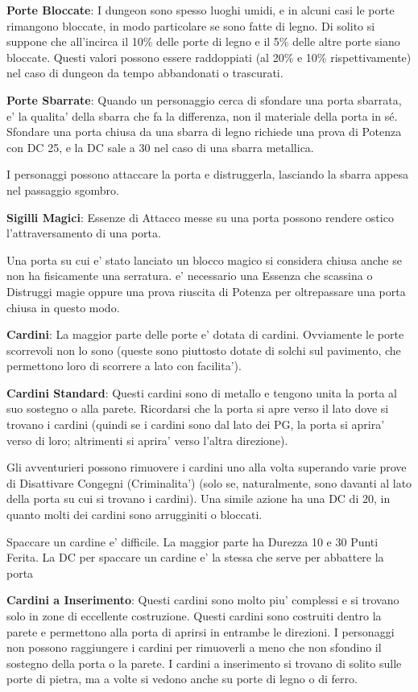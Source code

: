\documentclass[a4paper,11pt,twoside,openany]{book}
\begin{document}
{\textbf{Porte Bloccate}: I dungeon sono spesso luoghi umidi, e in alcuni casi le porte rimangono bloccate, in modo particolare se sono fatte di legno. Di solito si suppone che all'incirca il 10\% delle porte di legno e il 5\% delle altre porte siano bloccate. Questi valori possono essere raddoppiati (al 20\% e 10\% rispettivamente) nel caso di dungeon da tempo abbandonati o trascurati.

\textbf{Porte Sbarrate}: Quando un personaggio cerca di sfondare una porta sbarrata, e' la qualita' della sbarra che fa la differenza, non il materiale della porta in sé. Sfondare una porta chiusa da una sbarra di legno richiede una prova di Potenza con DC 25, e la DC sale a 30 nel caso di una sbarra metallica.

I personaggi possono attaccare la porta e distruggerla, lasciando la sbarra appesa nel passaggio sgombro.

\textbf{Sigilli Magici}: Essenze di Attacco messe su una porta possono rendere ostico l'attraversamento di una porta.

Una porta su cui e' stato lanciato un blocco magico si considera chiusa anche se non ha fisicamente una serratura. e' necessario una Essenza che scassina o Distruggi magie oppure una prova riuscita di Potenza per oltrepassare una porta chiusa in questo modo.

\textbf{Cardini}: La maggior parte delle porte e' dotata di cardini. Ovviamente le porte scorrevoli non lo sono (queste sono piuttosto dotate di solchi sul pavimento, che permettono loro di scorrere a lato con facilita').

\textbf{Cardini Standard}: Questi cardini sono di metallo e tengono unita la porta al suo sostegno o alla parete. Ricordarsi che la porta si apre verso il lato dove si trovano i cardini (quindi se i cardini sono dal lato dei PG, la porta si aprira' verso di loro; altrimenti si aprira' verso l’altra direzione). 

Gli avventurieri possono rimuovere i cardini uno alla volta superando varie prove di Disattivare Congegni (Criminalita') (solo se, naturalmente, sono davanti al lato della porta su cui si trovano i cardini). Una simile azione ha una DC di 20, in quanto molti dei cardini sono arrugginiti o bloccati. 

Spaccare un cardine e' difficile. La maggior parte ha Durezza 10 e 30 Punti Ferita. La DC per spaccare un cardine e' la stessa che serve per abbattere la porta

\textbf{Cardini a Inserimento}: Questi cardini sono molto piu' complessi e si trovano solo in zone di eccellente costruzione. Questi cardini sono costruiti dentro la parete e permettono alla porta di aprirsi in entrambe le direzioni. I personaggi non possono raggiungere i cardini per rimuoverli a meno che non sfondino il sostegno della porta o la parete. I cardini a inserimento si trovano di solito sulle porte di pietra, ma a volte si vedono anche su porte di legno o di ferro.

}
\end{document}
